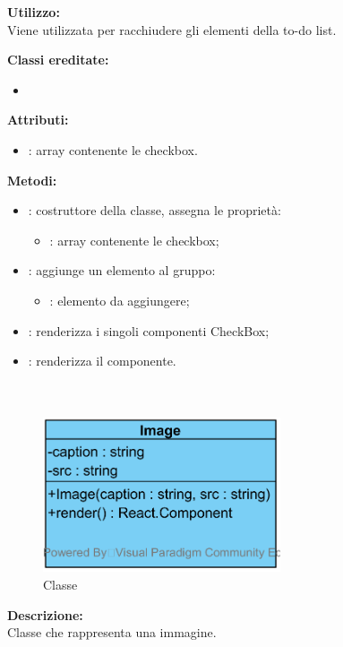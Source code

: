\textbf{Utilizzo:}\\
Viene utilizzata per racchiudere gli elementi della to-do list.

\textbf{Classi ereditate:}
\begin{itemize}
	\item {}
\end{itemize}


\textbf{Attributi:}
\begin{itemize}
	\item {}: array contenente le checkbox.
\end{itemize}

\textbf{Metodi:}
\begin{itemize}
	\item {}: costruttore della classe, assegna le proprietà:
	\begin{itemize}
		\item {}: array contenente le checkbox;
	\end{itemize}
	\item {}: aggiunge un elemento al gruppo:
	\begin{itemize}
		\item {}: elemento da aggiungere;
	\end{itemize}
	\item {}: renderizza i singoli componenti CheckBox;
	\item {}: renderizza il componente.
\end{itemize}

\paragraph[::Image]{\class}\mbox{}\\ \label{\class}
\begin{figure}[H]
	\centering
	\includegraphics[width=7cm]{./diagrammi/framework/view/gui/image.png}
	\caption{Classe \class}
\end{figure}
\textbf{Descrizione:}\\
Classe che rappresenta una immagine.

